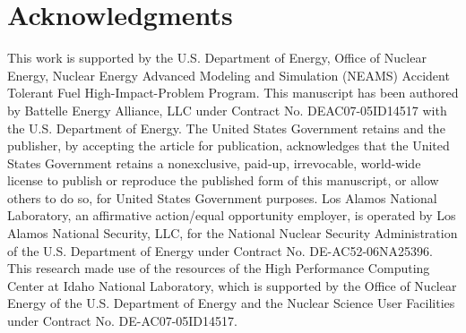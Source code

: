 \documentclass[review]{elsarticle}
\begin{document}
\section{Acknowledgments}
This work is supported by the U.S. Department of Energy, Office of Nuclear Energy, Nuclear Energy Advanced Modeling and Simulation (NEAMS) Accident Tolerant Fuel High-Impact-Problem Program. This manuscript has been authored by Battelle Energy Alliance, LLC under Contract No. DEAC07-05ID14517 with the U.S. Department of Energy. The United States Government retains and the publisher, by accepting the article for publication, acknowledges that the United States Government retains a nonexclusive, paid-up, irrevocable, world-wide license to publish or reproduce the published form of this manuscript, or allow others to do so, for United States Government purposes.  Los Alamos National Laboratory, an affirmative action/equal opportunity employer, is operated by Los Alamos National Security, LLC, for the National Nuclear Security Administration of the U.S. Department of Energy under Contract No. DE-AC52-06NA25396.  This research made use of the resources of the High Performance Computing Center at Idaho National Laboratory, which is supported by the Office of Nuclear Energy of the U.S. Department of Energy and the Nuclear Science User Facilities under Contract No. DE-AC07-05ID14517.
\end{document}
